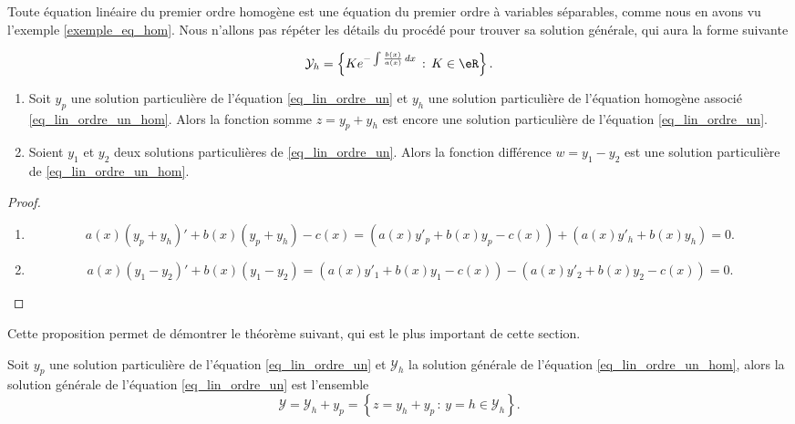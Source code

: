 Toute équation linéaire du premier ordre homogène est une équation du premier ordre à variables séparables, comme nous en avons vu l'exemple \ref{exemple_eq_hom}. Nous n'allons pas répéter les détails du procédé pour trouver sa solution générale, qui aura la forme suivante
\begin{Aretenir}
	\begin{equation}\label{solgeneqlinordre1}
		\mathcal{Y}_h=\left\{Ke^{-\int\frac{b(x)}{a(x)}\, dx}\,:\, K\in\eR\right\}.
	\end{equation}
\end{Aretenir}
\begin{proposition}
	\begin{enumerate}
		\item Soit $y_p$ une solution particulière de l'équation \eqref{eq_lin_ordre_un} et $y_h$ une solution particulière de l'équation homogène associé \eqref{eq_lin_ordre_un_hom}. Alors la fonction somme $z= y_p+y_h$ est encore une solution particulière de l'équation \eqref{eq_lin_ordre_un}.
		\item Soient $y_1$ et $y_2$ deux solutions particulières de \eqref{eq_lin_ordre_un}. Alors la fonction différence $w = y_1-y_2$ est une solution particulière de \eqref{eq_lin_ordre_un_hom}.
	\end{enumerate}
\end{proposition}
\begin{proof}
	\begin{enumerate}
		\item
		      \begin{equation}
			      a(x)\left(y_p+y_h\right)' + b(x)\left(y_p+y_h\right)-c(x)  =\left( a(x)y'_p+ b(x)y_p-c(x)\right) + \left( a(x)y'_h+ b(x)y_h\right) = 0.
		      \end{equation}
		\item
		      \begin{equation}
			      a(x)\left(y_1-y_2\right)' + b(x)\left(y_1-y_2\right) =\left( a(x)y'_1+ b(x)y_1-c(x)\right) -\left( a(x)y'_2+ b(x)y_2-c(x)\right) = 0.
		      \end{equation}
	\end{enumerate}
\end{proof}
Cette proposition permet de démontrer le théorème suivant, qui est le plus important de cette section.
\begin{theorem}
	Soit $y_p$ une solution particulière de l'équation \eqref{eq_lin_ordre_un} et $\mathcal{Y}_h$ la solution générale de l'équation \eqref{eq_lin_ordre_un_hom}, alors la solution générale de l'équation \eqref{eq_lin_ordre_un} est l'ensemble
	\begin{equation}
		\mathcal{Y} = \mathcal{Y}_h +y_p = \left\{z= y_h + y_p\,:\, y=h \in\mathcal{Y}_h \right\}.
	\end{equation}
\end{theorem}
